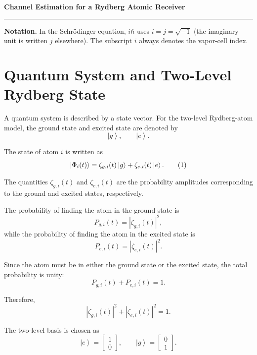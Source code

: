 \documentclass[12pt,a4paper]{article}
\newcommand{\ketg}{\left|g\right\rangle}
\newcommand{\kete}{\left|e\right\rangle}
\begin{document}
\begin{center}
    {\Large\bfseries Channel Estimation for a Rydberg Atomic Receiver}\\[4pt]
\end{center}

\hrule
\vspace{8pt}

\textbf{Notation.} In the Schr\"odinger equation, $i\hbar$ uses
$i=j=\sqrt{-1}$ (the imaginary unit is written $j$ elsewhere). The
subscript $i$ always denotes the vapor-cell index.

\section{Quantum System and Two-Level Rydberg State}

A quantum system is described by a state vector. For the two-level
Rydberg-atom model, the ground state and excited state are denoted
by
\[
\ketg,
\qquad
\kete.
\]

The state of atom \(i\) is written as
\begin{equation}
\ket{\Phi_i(t)}
=
\zeta_{g,i}(t)\ketg
+
\zeta_{e,i}(t)\kete .
\tag{1}
\end{equation}

The quantities
\(\zeta_{g,i}(t)\) and \(\zeta_{e,i}(t)\) are the probability
amplitudes corresponding to the ground and excited states,
respectively.

The probability of finding the atom in the ground state is
\[
P_{g,i}(t)
=
\left|\zeta_{g,i}(t)\right|^2,
\]
while the probability of finding the atom in the excited state is
\[
P_{e,i}(t)
=
\left|\zeta_{e,i}(t)\right|^2.
\]

Since the atom must be in either the ground state or the excited
state, the total probability is unity:
\[
P_{g,i}(t)+P_{e,i}(t)=1.
\]

Therefore,
\[
\boxed{
\left|\zeta_{g,i}(t)\right|^2
+
\left|\zeta_{e,i}(t)\right|^2
=1.
}
\]

The two-level basis is chosen as
\[
\kete
=
\begin{bmatrix}
1\\
0
\end{bmatrix},
\qquad
\ketg
=
\begin{bmatrix}
0\\
1
\end{bmatrix}.
\]
\end{document}
